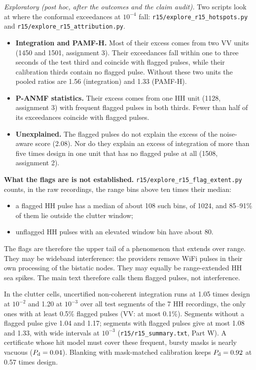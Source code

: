 \documentclass[10pt]{article}
\begin{document}
\emph{Exploratory (post hoc, after the outcomes and the claim audit).} Two scripts look at where the conformal exceedances at $10^{-4}$ fall: \texttt{r15/explore\_r15\_hotspots.py} and \texttt{r15/explore\_r15\_attribution.py}.
\begin{itemize}
\item \textbf{Integration and PAMF-H.} Most of their excess comes from two VV units (1450 and 1501, assignment 3). Their exceedances fall within one to three seconds of the test third and coincide with flagged pulses, while their calibration thirds contain no flagged pulse. Without these two units the pooled ratios are 1.56 (integration) and 1.33 (PAMF-H).
\item \textbf{P-ANMF statistics.} Their excess comes from one HH unit (1128, assignment 3) with frequent flagged pulses in both thirds. Fewer than half of its exceedances coincide with flagged pulses.
\item \textbf{Unexplained.} The flagged pulses do not explain the excess of the noise-aware score (2.08). Nor do they explain an excess of integration of more than five times design in one unit that has no flagged pulse at all (1508, assignment 2).
\end{itemize}
\textbf{What the flags are is not established.} \texttt{r15/explore\_r15\_flag\_extent.py} counts, in the raw recordings, the range bins above ten times their median:
\begin{itemize}
\item a flagged HH pulse has a median of about 108 such bins, of 1024, and 85--91\% of them lie outside the clutter window;
\item unflagged HH pulses with an elevated window bin have about 80.
\end{itemize}
The flags are therefore the upper tail of a phenomenon that extends over range. They may be wideband interference: the providers remove WiFi pulses in their own processing of the bistatic nodes. They may equally be range-extended HH sea spikes. The main text therefore calls them flagged pulses, not interference.

In the clutter cells, uncertified non-coherent integration runs at 1.05 times design at $10^{-2}$ and 1.20 at $10^{-3}$ over all test segments of the 7 HH recordings, the only ones with at least 0.5\% flagged pulses (VV: at most 0.1\%). Segments without a flagged pulse give 1.04 and 1.17; segments with flagged pulses give at most 1.08 and 1.33, with wide intervals at $10^{-3}$ (\texttt{r15/r15\_summary.txt}, Part W). A certificate whose hit model must cover these frequent, bursty masks is nearly vacuous ($P_{\rm d}=0.04$). Blanking with mask-matched calibration keeps $P_{\rm d}=0.92$ at 0.57 times design.
\end{document}
